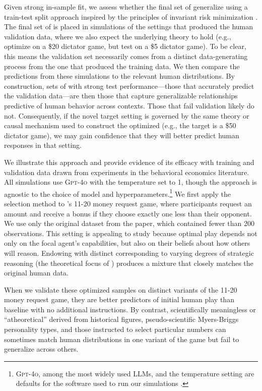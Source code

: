Given strong in-sample fit, we assess whether the final set of  generalize using a train-test split approach inspired by the principles of invariant risk minimization \citep{Peters2016invariant,Heinze2018invariant,arjovsky2020invariant}.
The final set of  is placed in simulations of the settings that produced the human validation data, where we also expect the underlying theory to hold (e.g., optimize on a \$20 dictator game, but test on a \$5 dictator game).
To be clear, this means the validation set necessarily comes from a distinct data-generating process from the one that produced the training data. 
We then compare the predictions from these simulations to the relevant human distributions.
By construction, sets of  with strong test performance---those that accurately predict the validation data---are then those that capture generalizable relationships predictive of human behavior across contexts.
Those that fail validation likely do not.
Consequently, if the novel target setting is governed by the same theory or causal mechanism used to construct the optimized  (e.g., the target is a \$50 dictator game), we may gain confidence that they will better predict human responses in that setting.

We illustrate this approach and provide evidence of its efficacy with training and validation data drawn from experiments in the behavioral economics literature.
All simulations use \textsc{Gpt-4o} with the temperature set to 1, though the approach is agnostic to the choice of model and hyperparameters.\footnote{\textsc{Gpt-4o}, among the most widely used LLMs, and the temperature setting are defaults for the software used to run our simulations \citep{Horton2024EDSL}.}
We first apply the selection method to \citet{1120Arad2012}'s 11-20 money request game, where participants request an amount and receive a bonus if they choose exactly one less than their opponent. 
We use only the original dataset from the paper, which contained fewer than 200 observations.
This setting is appealing to study because optimal play depends not only on the focal agent's capabilities, but also on their beliefs about how others will reason.
Endowing  with distinct  corresponding to varying degrees of strategic reasoning (the theoretical focus of \citeauthor{1120Arad2012}) produces a mixture that closely matches the original human data.

When we validate these optimized samples on distinct variants of the 11-20 money request game, they are better predictors of initial human play than baseline  with no additional instructions.
By contrast, scientifically meaningless or ``atheoretical''  derived from historical figures, pseudo-scientific Myers-Briggs personality types, and those instructed to select particular numbers can sometimes match human distributions in one variant of the game but fail to generalize across others.

